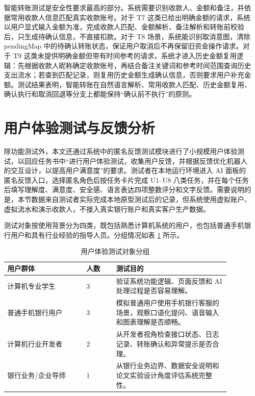 \documentclass[bachelor, print]{xduthesis}
\begin{document}
智能转账测试是安全性要求最高的部分。系统需要识别收款人、金额和备注，并依据常用收款人信息匹配真实收款账号。对于 T7 这类已给出明确金额的请求，系统以用户显式输入金额为准，完成收款人匹配、金额解析、备注解析和转账前校验后，只生成待确认信息，不直接扣款。对于 T8 场景，系统能识别取消意图，清除 pendingMap 中的待确认转账状态，保证用户取消后不再保留旧资金操作请求。对于 T9 这类未提供明确金额但带有时间参考的请求，系统才进入历史金额复用逻辑：先根据收款人昵称确定收款账号，再结合备注关键词和参考时间范围查询历史支出流水；若查到匹配记录，则复用历史金额生成确认信息，否则要求用户补充金额。测试结果表明，智能转账在自然语言解析、常用收款人匹配、历史金额复用、确认执行和取消回退等分支上都能保持“确认前不执行”的原则。

\section{用户体验测试与反馈分析}

除功能测试外，本文还通过系统中的匿名反馈测试模块进行了小规模用户体验测试，以回应任务书中“进行用户体验测试，收集用户反馈，并根据反馈优化机器人的交互设计，以提高用户满意度”的要求。测试者在本地运行环境进入 AI 面板的匿名反馈入口，选择匿名角色后按任务卡片完成 U1--U8 八类任务，并在每个任务后填写理解度、满意度、安全感、语言表达四项整数评分和文字反馈。需要说明的是，本节数据来自测试者实际完成本地原型测试后的记录，但系统使用虚拟账户、虚拟流水和演示收款人，不接入真实银行账户和真实客户生产数据。

测试对象按使用背景分为四类，既包括熟悉计算机系统的用户，也包括普通手机银行用户和具有行业经验的指导人员。分组情况如表 \ref{tab:user-experience-group} 所示。

\begin{table}[H]
    \centering
    \caption{用户体验测试对象分组}
    \label{tab:user-experience-group}
    \small
    \setlength{\tabcolsep}{4pt}
    \begin{tabular}{|p{0.32\linewidth}|p{0.12\linewidth}|p{0.46\linewidth}|}
        \hline
        用户群体 & 人数 & 测试目的 \\
        \hline
        计算机专业学生 & 3 & 验证系统功能逻辑、页面反馈和 AI 处理过程是否容易理解。 \\
        \hline
        普通手机银行用户 & 3 & 模拟普通用户使用手机银行客服的场景，观察口语化提问、语音输入和图表理解是否顺畅。 \\
        \hline
        计算机行业开发者 & 2 & 从开发者视角检查接口状态、日志记录、转账确认和异常提示是否合理。 \\
        \hline
        银行业务/企业导师 & 1 & 从银行业务边界、数据安全说明和论文实验设计角度评估系统完整性。 \\
        \hline
    \end{tabular}
\end{table}
\end{document}
